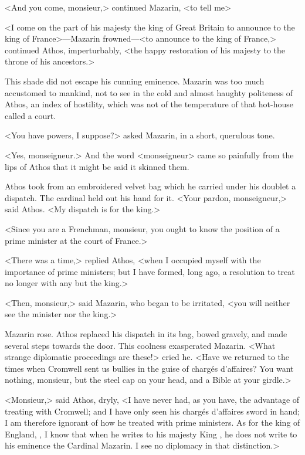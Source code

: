 <And you come, monsieur,> continued Mazarin, <to tell me\longdash>

<I come on the part of his majesty the king of Great Britain to announce to the king of France>—Mazarin frowned—<to announce to the king of France,> continued Athos, imperturbably, <the happy restoration of his majesty  to the throne of his ancestors.>

This shade did not escape his cunning eminence. Mazarin was too much accustomed to mankind, not to see in the cold and almost haughty politeness of Athos, an index of hostility, which was not of the temperature of that hot-house called a court.

<You have powers, I suppose?> asked Mazarin, in a short, querulous tone.

<Yes, monseigneur.> And the word <monseigneur> came so painfully from the lips of Athos that it might be said it skinned them.

Athos took from an embroidered velvet bag which he carried under his doublet a dispatch. The cardinal held out his hand for it. <Your pardon, monseigneur,> said Athos. <My dispatch is for the king.>

<Since you are a Frenchman, monsieur, you ought to know the position of a prime minister at the court of France.>

<There was a time,> replied Athos, <when I occupied myself with the importance of prime ministers; but I have formed, long ago, a resolution to treat no longer with any but the king.>

<Then, monsieur,> said Mazarin, who began to be irritated, <you will neither see the minister nor the king.>

Mazarin rose. Athos replaced his dispatch in its bag, bowed gravely, and made several steps towards the door. This coolness exasperated Mazarin. <What strange diplomatic proceedings are these!> cried he. <Have we returned to the times when Cromwell sent us bullies in the guise of chargés d'affaires? You want nothing, monsieur, but the steel cap on your head, and a Bible at your girdle.>

<Monsieur,> said Athos, dryly, <I have never had, as you have, the advantage of treating with Cromwell; and I have only seen his chargés d'affaires sword in hand; I am therefore ignorant of how he treated with prime ministers. As for the king of England, , I know that when he writes to his majesty King , he does not write to his eminence the Cardinal Mazarin. I see no diplomacy in that distinction.>

